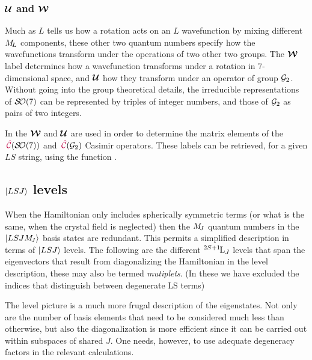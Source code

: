 \documentclass[11pt, twoside,openright]{article}
\begin{document}
 

\subsubsection{$\boldsymbol{\mathcal{U}}$ and $\boldsymbol{\mathcal{W}}$}

Much as $L$ tells us how a rotation acts on an $L$ wavefunction by mixing different $M_{\!{L}}$ components, these other two quantum numbers specify how the wavefunctions transform under the operations of two other two groups. The $\boldsymbol{\mathcal{W}}$ label determines how a wavefunction transforms under a rotation in 7-dimensional space, and $\boldsymbol{\mathcal{U}}$ how they transform under an operator of group $\mathcal{G}_2$. Without going into the group theoretical details, the irreducible representations of $\mathcal{S\!O}(7)$ can be represented by triples of integer numbers, and those of $\mathcal{G}_2$ as pairs of two integers.

In \qlanth the $\boldsymbol{\mathcal{W}}$ and $\boldsymbol{\mathcal{U}}$ are used in order to determine the matrix elements of the ${\,\mathcal{\textcolor{purple}{\hat{C}}}}(\mathcal{S\!O}(7))$ and ${\,\mathcal{\textcolor{purple}{\hat{C}}}}(\mathcal{G}_2)$ Casimir operators. These labels can be retrieved, for a given $LS$ string, using the function .

 


\subsection{$|LSJ\rangle$ levels}

When the Hamiltonian only includes spherically symmetric terms (or what is the same, when the crystal field is neglected) then the $M_{\!{J}}$ quantum numbers in the $|LSJM_{\!{J}}\rangle$ basis states are redundant. This permits a simplified description  in terms of $|LSJ\rangle$ levels. The following are the different ${}^{2S+1}{\kern-0.1em}{\text{L}}_{J}$ levels that span the eigenvectors that result from diagonalizing the Hamiltonian in the level description, these may also be termed \textit{mutiplets}. (In these we have excluded the indices that distinguish between degenerate LS terms)



The level picture is a much more frugal description of the eigenstates. Not only are the number of basis elements that need to be considered much less than otherwise, but also the diagonalization is more efficient since it can be carried out within subspaces of shared $J$. One needs, however, to use adequate degeneracy factors in the relevant calculations.
\end{document}
